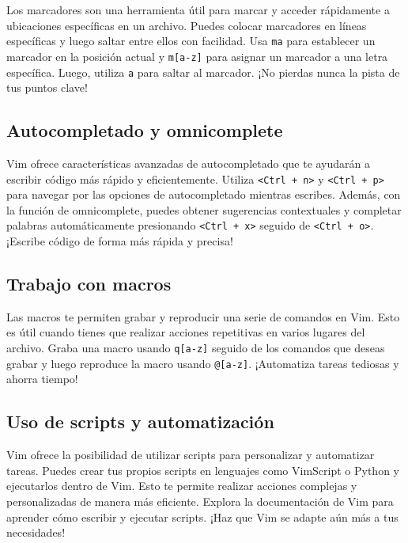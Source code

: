 \documentclass[
  a4paper,
]{article}
\begin{document}
Los marcadores son una herramienta útil para marcar y acceder
rápidamente a ubicaciones específicas en un archivo. Puedes colocar
marcadores en líneas específicas y luego saltar entre ellos con
facilidad. Usa \texttt{ma} para establecer un marcador en la posición
actual y \texttt{m{[}a-z{]}} para asignar un marcador a una letra
específica. Luego, utiliza \texttt{\textquotesingle{}a} para saltar al
marcador. ¡No pierdas nunca la pista de tus puntos clave!

\hypertarget{autocompletado-y-omnicomplete}{%
\subsection{Autocompletado y
omnicomplete}\label{autocompletado-y-omnicomplete}}

Vim ofrece características avanzadas de autocompletado que te ayudarán a
escribir código más rápido y eficientemente. Utiliza
\texttt{\textless{}Ctrl\ +\ n\textgreater{}} y
\texttt{\textless{}Ctrl\ +\ p\textgreater{}} para navegar por las
opciones de autocompletado mientras escribes. Además, con la función de
omnicomplete, puedes obtener sugerencias contextuales y completar
palabras automáticamente presionando
\texttt{\textless{}Ctrl\ +\ x\textgreater{}} seguido de
\texttt{\textless{}Ctrl\ +\ o\textgreater{}}. ¡Escribe código de forma
más rápida y precisa!

\hypertarget{trabajo-con-macros}{%
\subsection{Trabajo con macros}\label{trabajo-con-macros}}

Las macros te permiten grabar y reproducir una serie de comandos en Vim.
Esto es útil cuando tienes que realizar acciones repetitivas en varios
lugares del archivo. Graba una macro usando \texttt{q{[}a-z{]}} seguido
de los comandos que deseas grabar y luego reproduce la macro usando
\texttt{@{[}a-z{]}}. ¡Automatiza tareas tediosas y ahorra tiempo!

\hypertarget{uso-de-scripts-y-automatizaciuxf3n}{%
\subsection{Uso de scripts y
automatización}\label{uso-de-scripts-y-automatizaciuxf3n}}

Vim ofrece la posibilidad de utilizar scripts para personalizar y
automatizar tareas. Puedes crear tus propios scripts en lenguajes como
VimScript o Python y ejecutarlos dentro de Vim. Esto te permite realizar
acciones complejas y personalizadas de manera más eficiente. Explora la
documentación de Vim para aprender cómo escribir y ejecutar scripts.
¡Haz que Vim se adapte aún más a tus necesidades!
\end{document}
